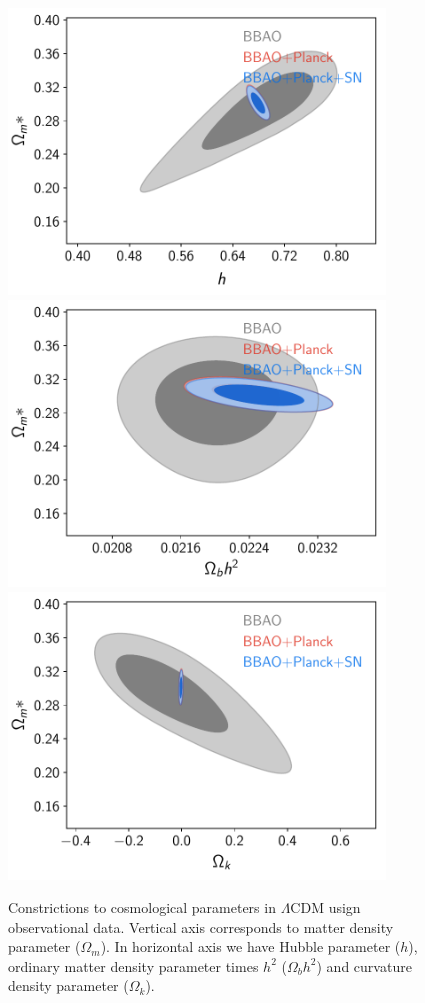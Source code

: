 \documentclass[onecolumn,           %
               showpacs,            %
               preprintnumbers,     %
               aps,                 %
               prl,          	    %
               letterpaper,             %
               superscriptaddress,      %
               nofootinbib,         %
               tightenlines,        %
               floats,floatfix      %
               ,usenatbib,
               ]{revtex4-1}
\begin{document}
\begin{figure}[h]
	\centering
	\includegraphics[width=10cm]{FiguresCosmo/h_Om_cLCDM_todas.pdf}	
	\includegraphics[width=10cm]{FiguresCosmo/Obh2_Om_cLCDM_todas.pdf}
	\includegraphics[width=10cm]{FiguresCosmo/Ok_Om_cLCDM_todas.pdf}
	\caption{Constrictions to cosmological parameters in $\Lambda$CDM usign observational data. Vertical axis corresponds to matter density parameter ($\Omega_m$). In horizontal axis we have Hubble parameter ($h$), ordinary matter density parameter times $h^2$ ($\Omega_b h^2$) and curvature density parameter ($\Omega_k$).}
	\label{cLCDM}
\end{figure}
\end{document}
